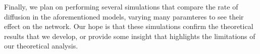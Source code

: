 \documentclass[format=acmsmall, review=false]{acmart}
\begin{document}
\par Finally, we plan on performing several simulations that compare the rate of diffusion in the aforementioned models,
varying many paramteres to see their effect on the network. Our hope is that these simulations confirm the theoretical
results that we develop, or provide some insight that highlights the limitations of our theoretical analysis.


%	
%	



\end{document}
